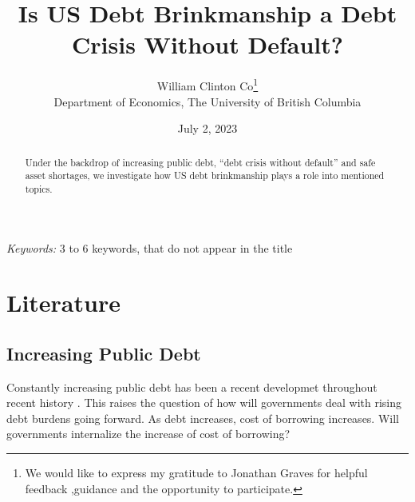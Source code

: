 \documentclass[
  12pt]{article}
\begin{document}
\def\spacingset#1{\renewcommand{\baselinestretch}%
{#1}\small\normalsize} \spacingset{1}



\date{July 2, 2023}
\title{\bf Is US Debt Brinkmanship a Debt Crisis Without Default?}
\author{
William Clinton Co\thanks{We would like to express my gratitude to
Jonathan Graves for helpful feedback ,guidance and the opportunity to
participate.}\\
Department of Economics, The University of British Columbia\\
}
\maketitle

\bigskip
\bigskip
\begin{abstract}
Under the backdrop of increasing public debt, ``debt crisis without
default'' and safe asset shortages, we investigate how US debt
brinkmanship plays a role into mentioned topics.
\end{abstract}

\noindent%
{\it Keywords:} 3 to 6 keywords, that do not appear in the title
\vfill

\newpage
\spacingset{1.9} %
\ifdefined\Shaded\renewenvironment{Shaded}{\begin{tcolorbox}[boxrule=0pt, frame hidden, borderline west={3pt}{0pt}{shadecolor}, sharp corners, interior hidden, breakable, enhanced]}{\end{tcolorbox}}\fi

\hypertarget{sec-l}{%
\section{Literature}\label{sec-l}}

\hypertarget{increasing-public-debt}{%
\subsection{Increasing Public Debt}\label{increasing-public-debt}}

Constantly increasing public debt has been a recent developmet
throughout recent history \citep{mitchener2023}. This raises the
question of how will governments deal with rising debt burdens going
forward. As debt increases, cost of borrowing increases. Will
governments internalize the increase of cost of borrowing?
\end{document}
